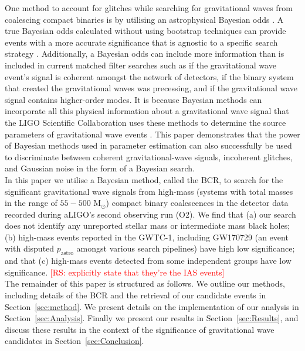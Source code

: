 \documentclass[%
preprint,
 amsmath,amssymb,
 aps,
]{revtex4}
\newcommand{\bcr}{{\sc BCR}\xspace}
\newcommand{\msun}{{\sc M${}_\odot$}\xspace}
\newcommand{\rs}[1]{\textcolor{red}{[RS: #1]}}
\begin{document}
One method to account for glitches while searching for gravitational waves from coalescing compact binaries is by utilising an astrophysical Bayesian odds  \cite{bci, BCR1, BCR2, bcr_gw151216, bayesian_odds}. A true Bayesian odds calculated without using bootstrap techniques can provide events with a more accurate significance that is agnostic to a specific search strategy \cite{BCR2, bcr_gw151216,  bayesian_odds}. Additionally, a Bayesian odds can include more information than is included in current matched filter searches such as if the gravitational wave event's signal is coherent amongst the network of detectors, if the binary system that created the gravitational waves was precessing, and if the gravitational wave signal contains higher-order modes.  It is because Bayesian methods can incorporate all this physical information about a gravitational wave signal that the LIGO Scientific Collaboration uses these methods to determine the source parameters of gravitational wave events \cite{abbott2016ligo, abbott2019gwtc}. This paper demonstrates that the power of Bayesian methods used in parameter estimation can also successfully be used to discriminate between coherent gravitational-wave signals, incoherent glitches, and Gaussian noise in the form of a Bayesian search. \\

In this paper we utilise a Bayesian method, called the \bcr \cite{BCR1}, to search for the significant gravitational wave signals from high-mass (systems with total masses in the range of $55-500$ \msun) compact binary coalescences in the detector data recorded during aLIGO's second observing run (O2).  We find that (a) our search does not identify any unreported stellar mass or intermediate mass black holes; (b) high-mass events reported in the GWTC-1, including GW170729 (an event with disputed $p_\text{astro}$ amongst various search pipelines) have high low significance; and that (c) high-mass events detected from some independent groups have low significance. \rs{explicitly state that they're the IAS events}\\

The remainder of this paper is structured as follows. We outline our methods, including details of the \bcr and the retrieval of our candidate events in Section~\ref{sec:method}. We present details on the implementation of our analysis in Section~\ref{sec:Analysis}. Finally we present our results in Section~\ref{sec:Results}, and discuss these results in the context of the significance of gravitational wave candidates in Section~\ref{sec:Conclusion}.
\end{document}

